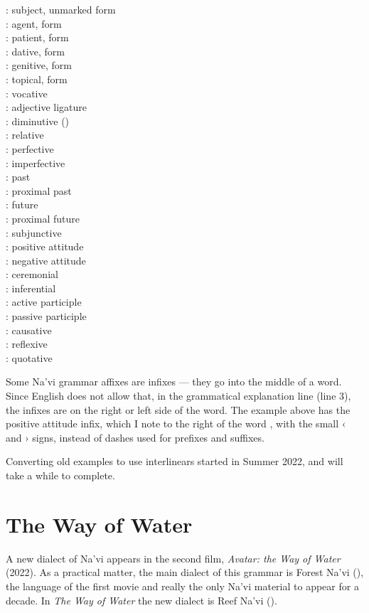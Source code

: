 \begin{multicols}{3}
\noindent{}: subject, unmarked form \\
: agent,  form \\
: patient,  form \\
: dative,  form \\
: genitive,  form \\
: topical,  form \\
: vocative  \\
: adjective  ligature\\
: diminutive () \\
: relative  \\
: perfective \\
: imperfective \\
: past \\
: proximal past \\
: future \\
: proximal future \\
: subjunctive \\
: positive attitude \\
: negative attitude \\
: ceremonial \\
: inferential \\
: active participle \\
: passive participle \\
: causative \\
: reflexive \\
: quotative 
\end{multicols}

\noindent Some Na'vi grammar affixes are infixes — they go into the
middle of a word.  Since English does not allow that, in the
grammatical explanation line (line 3), the infixes are on the right or
left side of the word.  The example above has the positive attitude
infix, which I note to the right of the word , with the small ‹
and › signs, instead of dashes used for prefixes and suffixes.

Converting old examples to use interlinears started in Summer 2022,
and will take a while to complete.


\section{The Way of Water}
A new dialect of Na'vi appears in the second film, \textit{Avatar: the
Way of Water} (2022).  As a practical matter, the main dialect of this
grammar is Forest Na'vi (), the language of the
first movie and really the only Na'vi material to appear for a decade.
In \textit{The Way of Water} the new dialect is Reef Na'vi ().

